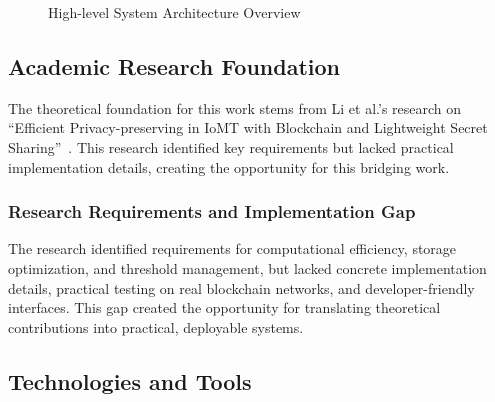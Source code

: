 \documentclass[12pt,a4paper]{article}
\begin{document}
\begin{figure}[H]
\centering
{}
\caption{High-level System Architecture Overview}
\label{fig:system_overview}
\end{figure}

\subsection{Academic Research Foundation}

The theoretical foundation for this work stems from Li et al.'s research on “Efficient Privacy-preserving in IoMT with Blockchain and Lightweight Secret Sharing”~\cite{li2023efficient}. This research identified key requirements but lacked practical implementation details, creating the opportunity for this bridging work.

\subsubsection{Research Requirements and Implementation Gap}

The research identified requirements for computational efficiency, storage optimization, and threshold management, but lacked concrete implementation details, practical testing on real blockchain networks, and developer-friendly interfaces. This gap created the opportunity for translating theoretical contributions into practical, deployable systems.

\subsection{Technologies and Tools}
\end{document}
